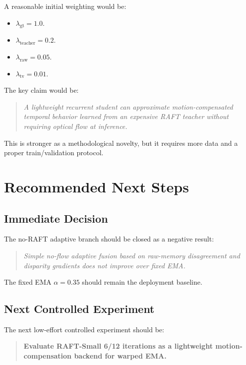 \documentclass[11pt,a4paper]{article}
\begin{document}
A reasonable initial weighting would be:

\begin{itemize}[leftmargin=*]
    \item $\lambda_{\mathrm{gt}}=1.0$.
    \item $\lambda_{\mathrm{teacher}}=0.2$.
    \item $\lambda_{\mathrm{raw}}=0.05$.
    \item $\lambda_{\mathrm{tv}}=0.01$.
\end{itemize}

The key claim would be:

\begin{quote}
\emph{A lightweight recurrent student can approximate motion-compensated temporal behavior learned from an expensive RAFT teacher without requiring optical flow at inference.}
\end{quote}

This is stronger as a methodological novelty, but it requires more data and a proper train/validation protocol.

\section{Recommended Next Steps}

\subsection{Immediate Decision}

The no-RAFT adaptive branch should be closed as a negative result:

\begin{quote}
\emph{Simple no-flow adaptive fusion based on raw-memory disagreement and disparity gradients does not improve over fixed EMA.}
\end{quote}

The fixed EMA $\alpha=0.35$ should remain the deployment baseline.

\subsection{Next Controlled Experiment}

The next low-effort controlled experiment should be:

\begin{quote}
\textbf{Evaluate RAFT-Small 6/12 iterations as a lightweight motion-compensation backend for warped EMA.}
\end{quote}
\end{document}
